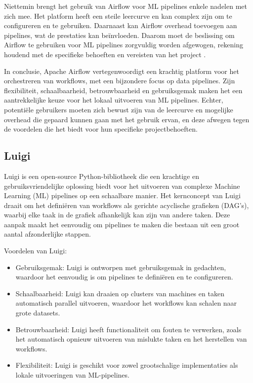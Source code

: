 Niettemin brengt het gebruik van Airflow voor ML pipelines enkele nadelen met zich mee. Het platform heeft een steile leercurve en kan complex zijn om te configureren en te gebruiken. Daarnaast kan Airflow overhead toevoegen aan pipelines, wat de prestaties kan beïnvloeden. Daarom moet de beslissing om Airflow te gebruiken voor ML pipelines zorgvuldig worden afgewogen, rekening houdend met de specifieke behoeften en vereisten van het project \autocite{Harenslak2021}.

In conclusie, Apache Airflow vertegenwoordigt een krachtig platform voor het orchestreren van workflows, met een bijzondere focus op data pipelines. Zijn flexibiliteit, schaalbaarheid, betrouwbaarheid en gebruiksgemak maken het een aantrekkelijke keuze voor het lokaal uitvoeren van ML pipelines. Echter, potentiële gebruikers moeten zich bewust zijn van de leercurve en mogelijke overhead die gepaard kunnen gaan met het gebruik ervan, en deze afwegen tegen de voordelen die het biedt voor hun specifieke projectbehoeften.

\subsection{Luigi}

Luigi is een open-source Python-bibliotheek die een krachtige en gebruiksvriendelijke oplossing biedt voor het uitvoeren van complexe Machine Learning (ML) pipelines op een schaalbare manier. Het kernconcept van Luigi draait om het definiëren van workflows als gerichte acyclische grafieken (DAG's), waarbij elke taak in de grafiek afhankelijk kan zijn van andere taken. Deze aanpak maakt het eenvoudig om pipelines te maken die bestaan uit een groot aantal afzonderlijke stappen.

Voordelen van Luigi:

\begin{itemize}
  \item Gebruiksgemak: Luigi is ontworpen met gebruiksgemak in gedachten, waardoor het eenvoudig is om pipelines te definiëren en te configureren.
  \item Schaalbaarheid: Luigi kan draaien op clusters van machines en taken automatisch parallel uitvoeren, waardoor het workflows kan schalen naar grote datasets.
  \item Betrouwbaarheid: Luigi heeft functionaliteit om fouten te verwerken, zoals het automatisch opnieuw uitvoeren van mislukte taken en het herstellen van workflows.
  \item Flexibiliteit: Luigi is geschikt voor zowel grootschalige implementaties als lokale uitvoeringen van ML-pipelines.
\end{itemize}

